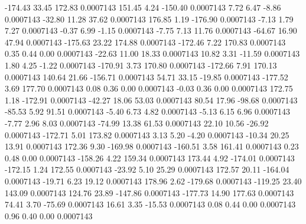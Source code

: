      -174.43       33.45      172.83     0.0007143
      151.45        4.24     -150.40     0.0007143
        7.72        6.47       -8.86     0.0007143
      -32.80       11.28       37.62     0.0007143
      176.85        1.19     -176.90     0.0007143
       -7.13        1.79        7.27     0.0007143
       -0.37        6.99       -1.15     0.0007143
       -7.75        7.13       11.76     0.0007143
      -64.67       16.90       47.94     0.0007143
     -175.63       23.22      174.88     0.0007143
     -172.46        7.22      170.83     0.0007143
        0.35        0.44        0.00     0.0007143
      -22.63       11.00       18.33     0.0007143
       10.82        3.31      -11.59     0.0007143
        1.80        4.25       -1.22     0.0007143
     -170.91        3.73      170.80     0.0007143
     -172.66        7.91      170.13     0.0007143
      140.64       21.66     -156.71     0.0007143
       54.71       33.15      -19.85     0.0007143
     -177.52        3.69      177.70     0.0007143
        0.08        0.36        0.00     0.0007143
       -0.03        0.36        0.00     0.0007143
      172.75        1.18     -172.91     0.0007143
      -42.27       18.06       53.03     0.0007143
       80.54       17.96      -98.68     0.0007143
      -85.53        5.92       91.51     0.0007143
       -5.40        6.73        4.82     0.0007143
       -5.13        6.15        6.96     0.0007143
       -7.77        2.96        8.03     0.0007143
      -74.99       13.38       61.53     0.0007143
       22.10       10.56      -26.92     0.0007143
     -172.71        5.01      173.82     0.0007143
        3.13        5.20       -4.20     0.0007143
      -10.34       20.25       13.91     0.0007143
      172.36        9.30     -169.98     0.0007143
     -160.51        3.58      161.41     0.0007143
        0.23        0.48        0.00     0.0007143
     -158.26        4.22      159.34     0.0007143
      173.44        4.92     -174.01     0.0007143
     -172.15        1.24      172.55     0.0007143
      -23.92        5.10       25.29     0.0007143
      172.57       20.11     -164.04     0.0007143
      -19.71        6.23       19.12     0.0007143
      178.96        2.62     -179.68     0.0007143
     -119.25       23.40      143.09     0.0007143
      124.76       23.89     -147.86     0.0007143
     -177.73       14.90      177.63     0.0007143
       74.41        3.70      -75.69     0.0007143
       16.61        3.35      -15.53     0.0007143
        0.08        0.44        0.00     0.0007143
        0.96        0.40        0.00     0.0007143
